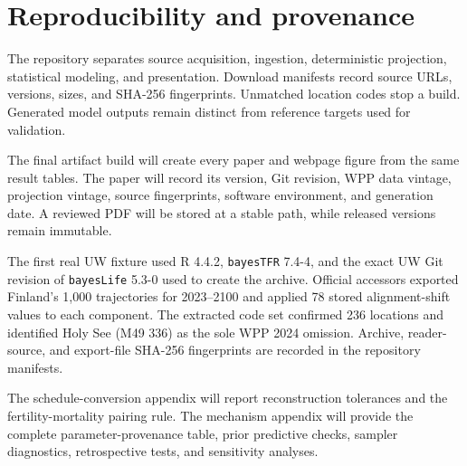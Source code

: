 \section{Reproducibility and provenance}

The repository separates source acquisition, ingestion, deterministic
projection, statistical modeling, and presentation. Download manifests record
source URLs, versions, sizes, and SHA-256 fingerprints. Unmatched location codes
stop a build. Generated model outputs remain distinct from reference targets
used for validation.

The final artifact build will create every paper and webpage figure from the
same result tables. The paper will record its version, Git revision, WPP data
vintage, projection vintage, source fingerprints, software environment, and
generation date. A reviewed PDF will be stored at a stable path, while released
versions remain immutable.

The first real UW fixture used R 4.4.2, \texttt{bayesTFR} 7.4-4, and the exact
UW Git revision of \texttt{bayesLife} 5.3-0 used to create the archive. Official
accessors exported Finland's 1,000 trajectories for 2023--2100 and applied 78
stored alignment-shift values to each component. The extracted code set
confirmed 236 locations and identified Holy See (M49 336) as the sole WPP 2024
omission. Archive, reader-source, and export-file SHA-256 fingerprints are
recorded in the repository manifests.

The schedule-conversion appendix will report reconstruction tolerances and the
fertility-mortality pairing rule. The mechanism appendix will provide the
complete parameter-provenance table, prior predictive checks, sampler
diagnostics, retrospective tests, and sensitivity analyses.
